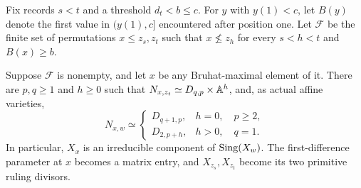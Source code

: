 Fix records $s<t$ and a threshold $d_t<b\leq c$.
For $y$ with $y(1)<c$, let $B(y)$ denote the first value in
$(y(1),c]$ encountered after position one. Let $\mathcal F$ be the finite
set of permutations $x\leq z_s,z_t$ such that $x\nleq z_h$ for every
$s<h<t$ and $B(x)\geq b$.

\begin{theorem}\label{ta:filtered}
Suppose $\mathcal F$ is nonempty, and let $x$ be any Bruhat-maximal
element of it. There are $p,q\geq1$ and $h\geq0$ such that
$N_{x,z_t}\simeq D_{q,p}\times\mathbb A^h$, and, as actual affine varieties,
\begin{equation}\label{ta:eq:ambient_models}
 N_{x,w}\simeq
 \begin{cases}
  D_{q+1,p},&h=0,\quad p\geq2,\\
  D_{2,p+h},&h>0,\quad q=1.
 \end{cases}
\end{equation}
In particular, $X_x$ is an irreducible component of $\operatorname{Sing}(X_w)$.
The first-difference parameter at $x$ becomes a matrix entry, and
$X_{z_s},X_{z_t}$ become its two primitive ruling divisors.
\end{theorem}

